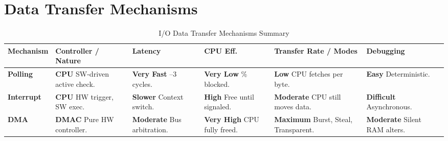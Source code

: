 \documentclass[10pt]{article}
\begin{document}
\section*{Data Transfer Mechanisms}

\begin{table}[H]
    \centering
    \footnotesize 
    \renewcommand{\arraystretch}{1.2} 
    \begin{tabular}{@{} l p{2.5cm} p{1.8cm} p{2cm} p{3.2cm} p{2cm} @{}}
        \toprule
        \textbf{Mechanism} & \textbf{Controller / Nature} & \textbf{Latency} & \textbf{CPU Eff.} & \textbf{Transfer Rate / Modes} & \textbf{Debugging} \\
        \midrule
        \textbf{Polling} & 
        \textbf{CPU} \newline SW-driven active check. & 
        \textbf{Very Fast} \newline 1--3 cycles. & 
        \textbf{Very Low} \newline 100\% blocked. & 
        \textbf{Low} \newline CPU fetches per byte. & 
        \textbf{Easy} \newline Deterministic. \\
        
        \textbf{Interrupt} & 
        \textbf{CPU} \newline HW trigger, SW exec. & 
        \textbf{Slower} \newline Context switch. & 
        \textbf{High} \newline Free until signaled. & 
        \textbf{Moderate} \newline CPU still moves data. & 
        \textbf{Difficult} \newline Asynchronous. \\
        
        \textbf{DMA} & 
        \textbf{DMAC} \newline Pure HW controller. & 
        \textbf{Moderate} \newline Bus arbitration. & 
        \textbf{Very High} \newline CPU fully freed. & 
        \textbf{Maximum} \newline Burst, Steal, Transparent. & 
        \textbf{Moderate} \newline Silent RAM alters. \\
        \bottomrule
    \end{tabular}
    \caption{I/O Data Transfer Mechanisms Summary}
\end{table}
\end{document}
